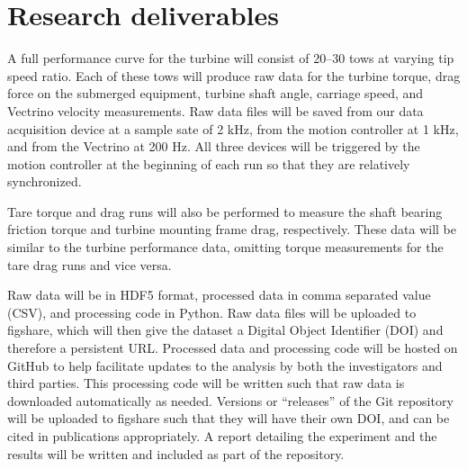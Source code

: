 \documentclass[12pt]{report}
\begin{document}
\chapter{Research deliverables}

A full performance curve for the turbine will consist of 20--30 tows at varying
tip speed ratio. Each of these tows will produce raw data for the turbine
torque, drag force on the submerged equipment, turbine shaft angle, carriage
speed, and Vectrino velocity measurements. Raw data files will be saved from our
data acquisition device at a sample sate of 2 kHz, from the motion controller at
1 kHz, and from the Vectrino at 200 Hz. All three devices will be triggered by
the motion controller at the beginning of each run so that they are relatively
synchronized.

Tare torque and drag runs will also be performed to measure the shaft bearing
friction torque and turbine mounting frame drag, respectively. These data will
be similar to the turbine performance data, omitting torque measurements for the
tare drag runs and vice versa.

Raw data will be in HDF5 format, processed data in comma separated value (CSV),
and processing code in Python. Raw data files will be uploaded to figshare,
which will then give the dataset a Digital Object Identifier (DOI) and therefore
a persistent URL. Processed data and processing code will be hosted on GitHub to
help facilitate updates to the analysis by both the investigators and third
parties. This processing code will be written such that raw data is downloaded
automatically as needed. Versions  or ``releases'' of the Git repository will be
uploaded to figshare such that they will have their own DOI, and can be cited in
publications appropriately. A report detailing the experiment and the results
will be written and included as part of the repository.

\renewcommand{\bibname}{References}


\end{document}
